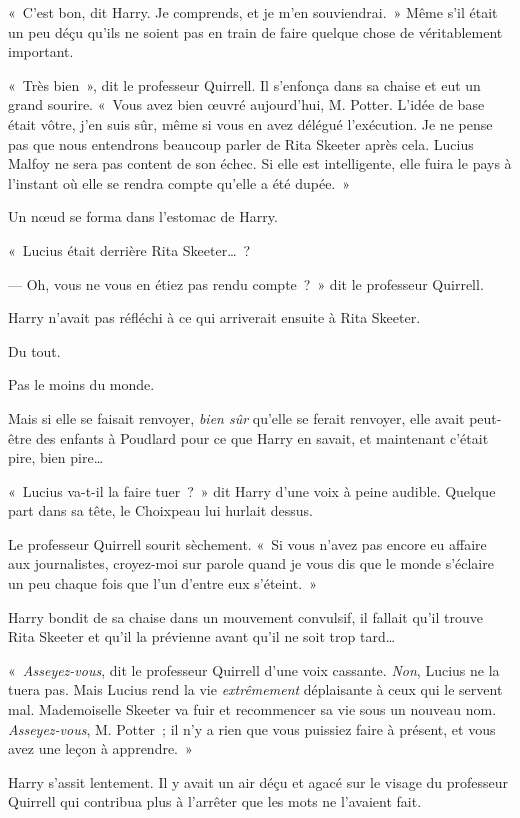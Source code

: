 «~C'est bon, dit Harry.
Je comprends, et je m'en souviendrai.~»
Même s'il était un peu déçu qu'ils ne soient pas en train de faire quelque chose de véritablement important.

«~Très bien~», dit le professeur Quirrell.
Il s'enfonça dans sa chaise et eut un grand sourire.
«~Vous avez bien œuvré aujourd'hui, M. Potter.
L'idée de base était vôtre, j'en suis sûr, même si vous en avez délégué l'exécution.
Je ne pense pas que nous entendrons beaucoup parler de Rita Skeeter après cela.
Lucius Malfoy ne sera pas content de son échec.
Si elle est intelligente, elle fuira le pays à l'instant où elle se rendra compte qu'elle a été dupée.~»

Un nœud se forma dans l'estomac de Harry.

«~Lucius était derrière Rita Skeeter…~?

--- Oh, vous ne vous en étiez pas rendu compte~?~»
dit le professeur Quirrell.

Harry n'avait pas réfléchi à ce qui arriverait ensuite à Rita Skeeter.

Du tout.

Pas le moins du monde.

Mais si elle se faisait renvoyer, \emph{bien sûr} qu'elle se ferait renvoyer, elle avait peut-être des enfants à Poudlard pour ce que Harry en savait, et maintenant c'était pire, bien pire…

«~Lucius va-t-il la faire tuer~?~»
dit Harry d'une voix à peine audible.
Quelque part dans sa tête, le Choixpeau lui hurlait dessus.

Le professeur Quirrell sourit sèchement.
«~Si vous n'avez pas encore eu affaire aux journalistes, croyez-moi sur parole quand je vous dis que le monde s'éclaire un peu chaque fois que l'un d'entre eux s'éteint.~»

Harry bondit de sa chaise dans un mouvement convulsif, il fallait qu'il trouve Rita Skeeter et qu'il la prévienne avant qu'il ne soit trop tard…

«~\emph{Asseyez-vous}, dit le professeur Quirrell d'une voix cassante.
\emph{Non}, Lucius ne la tuera pas.
Mais Lucius rend la vie \emph{extrêmement} déplaisante à ceux qui le servent mal.
Mademoiselle Skeeter va fuir et recommencer sa vie sous un nouveau nom.
\emph{Asseyez-vous}, M. Potter~; il n'y a rien que vous puissiez faire à présent, et vous avez une leçon à apprendre.~»

Harry s'assit lentement.
Il y avait un air déçu et agacé sur le visage du professeur Quirrell qui contribua plus à l'arrêter que les mots ne l'avaient fait.


